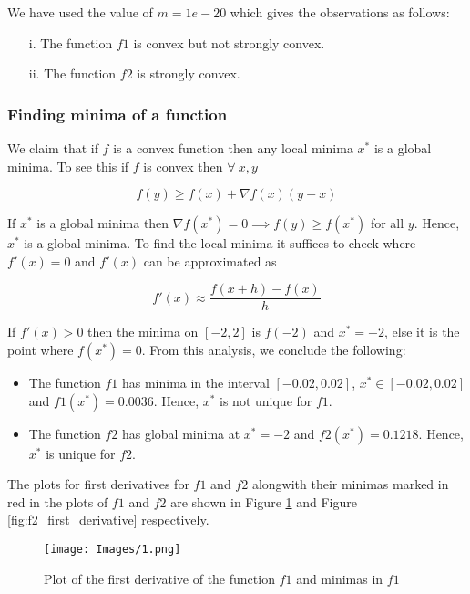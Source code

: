 \documentclass{article}
\begin{document}
We have used the value of $m = 1e-20$ which gives the observations as follows:

\begin{itemize}
    \item[i.] The function $f1$ is convex but not strongly convex.
    \item[ii.] The function $f2$ is strongly convex.
\end{itemize}

\subsubsection*{Finding minima of a function}

We claim that if $f$ is a convex function then any local minima $x^*$ is a global minima. To see this if $f$ is convex then $\forall\ x, y$

$$f(y) \geq f(x) + \nabla f(x) (y - x)$$

If $x^*$ is a global minima then $\nabla f(x^*) = 0 \implies f(y) \geq f(x^*)$ for all $y$. Hence, $x^*$ is a global minima. To find the local minima it suffices to check where $f'(x) = 0$ and $f'(x)$ can be approximated as

\[
    f'(x) \approx \frac{f(x + h) - f(x)}{h}
\]

If $f'(x) > 0$ then the minima on $[-2, 2]$ is $f(-2)$ and $x^* = -2$, else it is the point where $f(x^*) = 0$. From this analysis, we conclude the following:

\begin{itemize}
    \item The function $f1$ has minima in the interval $[-0.02, 0.02]$, $x^* \in [-0.02, 0.02]$ and $f1(x^*) = 0.0036$. Hence, $x^*$ is not unique for $f1$.
    \item The function $f2$ has global minima at $x^* = -2$ and $f2(x^*) = 0.1218$. Hence, $x^*$ is unique for $f2$.
\end{itemize}

The plots for first derivatives for $f1$ and $f2$ alongwith their minimas marked in red in the plots of $f1$ and $f2$ are shown in Figure \ref{fig:f1_first_derivative} and Figure \ref{fig:f2_first_derivative} respectively.

\begin{figure}
    \centering
    \texttt{[image: Images/1.png]}
    \caption{Plot of the first derivative of the function $f1$ and minimas in $f1$}
    \label{fig:f1_first_derivative}
\end{figure}
\end{document}

